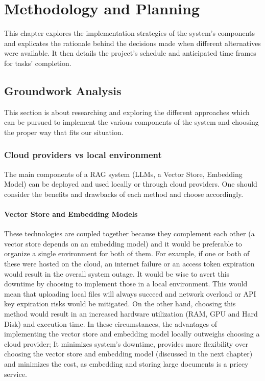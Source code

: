 \chapter{Methodology and Planning}
This chapter explores the implementation strategies of the system's components and explicates the rationale behind the decisions made when different alternatives were available. It then details the project's schedule and anticipated time frames for tasks' completion.
\newpage

\section{Groundwork Analysis}
This section is about researching and exploring the different approaches which can be pursued to implement the various components of the system and choosing the proper way that fits our situation.
\subsection{Cloud providers vs local environment}
The main components of a RAG system (LLMs, a Vector Store, Embedding Model) can be deployed and used locally or through cloud providers. One should consider the benefits and drawbacks of each method and choose accordingly.
\subsubsection{Vector Store and Embedding Models}
These technologies are coupled together because they complement each other (a vector store depends on an embedding model) and it would be preferable to organize a single environment for both of them. For example, if one or both of these were hosted on the cloud, an internet failure or an access token expiration would result in the overall system outage. It would be wise to avert this downtime by choosing to implement those in a local environment. This would mean that uploading local files will always succeed and network overload or API key expiration risks would be mitigated.\newline
On the other hand, choosing this method would result in an increased hardware utilization (RAM, GPU and Hard Disk) and execution time.\newline
In these circumstances, the advantages of implementing the vector store and embedding model locally outweighs choosing a cloud provider; It minimizes system's downtime, provides more flexibility over choosing the vector store and embedding model (discussed in the next chapter) and minimizes the cost, as embedding and storing large documents is a pricey service.
